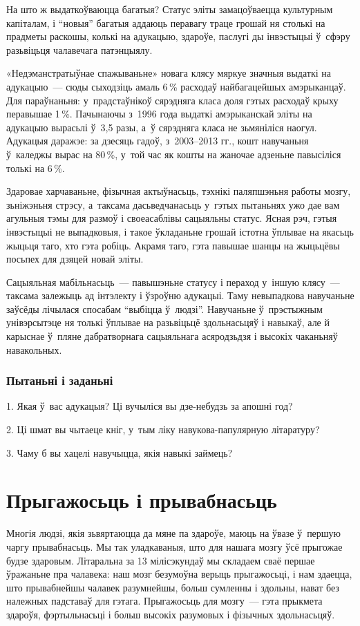 На што ж выдаткоўваюцца багатыя? Статус эліты замацоўваецца культурным капіталам, і ``новыя'' багатыя аддаюць перавагу траце грошай ня столькі на прадметы раскошы, колькі на адукацыю, здароўе, паслугі ды інвэстыцыі ў~сфэру разьвіцьця чалавечага патэнцыялу.

«Недэманстратыўнае спажываньне» новага клясу мяркуе значныя выдаткі на адукацыю~--- сюды сыходзіць амаль 6\,\% расходаў найбагацейшых амэрыканцаў. Для параўнаньня: у~прадстаўнікоў сярэдняга класа доля гэтых расходаў крыху перавышае 1\,\%. Пачынаючы з~1996 года выдаткі амэрыканскай эліты на адукацыю вырасьлі ў~3,5 разы, а~ў сярэдняга класа не зьмяніліся наогул. Адукацыя даражэе: за дзесяць гадоў, з~2003--2013 гг., кошт навучаньня ў~каледжы вырас на 80\,\%, у~той час як кошты на жаночае адзеньне павысіліся толькі на 6\,\%.

Здаровае харчаваньне, фізычная актыўнасьць, тэхнікі паляпшэньня работы мозгу, зьніжэньня стрэсу, а~таксама дасьведчанасьць у~гэтых пытаньнях ужо дае вам агульныя тэмы для размоў і своеасаблівы сацыяльны статус. Ясная рэч, гэтыя інвэстыцыі не выпадковыя, і такое ўкладаньне грошай істотна ўплывае на якасьць жыцьця таго, хто гэта робіць. Акрамя таго, гэта павышае шанцы на жыцьцёвы посьпех для дзяцей новай эліты.

Сацыяльная мабільнасьць~--- павышэньне статусу і пераход у~іншую клясу~--- таксама залежыць ад інтэлекту і ўзроўню адукацыі. Таму невыпадкова навучаньне заўсёды лічылася спосабам ``выбіцца ў~людзі''. Навучаньне ў~прэстыжным унівэрсытэце ня толькі ўплывае на разьвіцьцё здольнасьцяў і навыкаў, але й карыснае ў~пляне дабратворнага сацыяльнага асяродзьдзя і высокіх чаканьняў навакольных.

\subsubsection{Пытаньні і заданьні}

1. Якая ў~вас адукацыя? Ці вучыліся вы дзе-небудзь за апошні год?

2. Ці шмат вы чытаеце кніг, у~тым ліку навукова-папулярную літаратуру?

3. Чаму б вы хацелі навучыцца, якія навыкі займець?


\section{Прыгажосьць і прывабнасьць}

Многія людзі, якія зьвяртаюцца да мяне па здароўе, маюць на ўвазе ў~першую чаргу прывабнасьць. Мы так уладкаваныя, што для нашага мозгу ўсё прыгожае будзе здаровым. Літаральна за 13 мілісэкундаў мы складаем сваё першае ўражаньне пра чалавека: наш мозг безумоўна верыць прыгажосьці, і нам здаецца, што прывабнейшы чалавек разумнейшы, больш сумленны і здольны, нават без належных падставаў для гэтага. Прыгажосьць для мозгу~--- гэта прыкмета здароўя, фэртыльнасьці і больш высокіх разумовых і фізычных здольнасьцяў.

